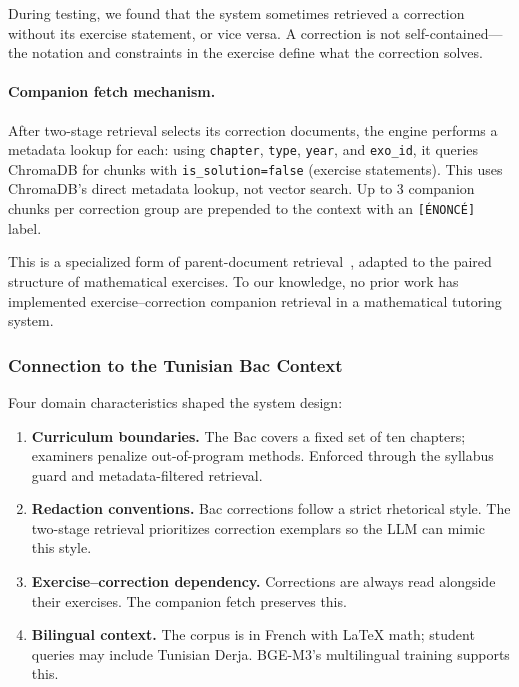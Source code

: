 During testing, we found that the system sometimes retrieved a correction
without its exercise statement, or vice versa. A correction is not
self-contained---the notation and constraints in the exercise define what
the correction solves.

\paragraph{Companion fetch mechanism.}
After two-stage retrieval selects its correction documents, the engine
performs a metadata lookup for each: using \texttt{chapter}, \texttt{type},
\texttt{year}, and \texttt{exo\_id}, it queries ChromaDB for chunks with
\texttt{is\_solution=false} (exercise statements). This uses ChromaDB's
direct metadata lookup, not vector search. Up to 3 companion chunks per
correction group are prepended to the context with an
\texttt{[\'ENONC\'E]} label.

This is a specialized form of parent-document
retrieval~\cite{gao2024rag_survey}, adapted to the paired structure of
mathematical exercises. To our knowledge, no prior work has implemented
exercise--correction companion retrieval in a mathematical tutoring system.


\subsubsection{Connection to the Tunisian Bac Context}
\label{subsec:bac-context}

Four domain characteristics shaped the system design:

\begin{enumerate}
    \item \textbf{Curriculum boundaries.} The Bac covers a fixed set of ten
    chapters; examiners penalize out-of-program methods. Enforced through
    the syllabus guard and metadata-filtered retrieval.

    \item \textbf{Redaction conventions.} Bac corrections follow a strict
    rhetorical style. The two-stage retrieval prioritizes correction
    exemplars so the LLM can mimic this style.

    \item \textbf{Exercise--correction dependency.} Corrections are always
    read alongside their exercises. The companion fetch preserves this.

    \item \textbf{Bilingual context.} The corpus is in French with \LaTeX{}
    math; student queries may include Tunisian Derja. BGE-M3's multilingual
    training supports this.
\end{enumerate}
